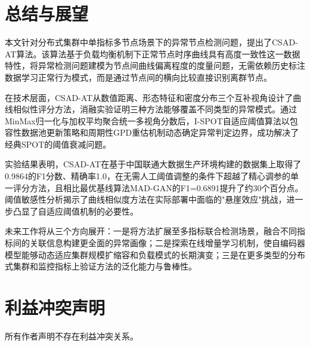 \documentclass[10.5pt,a4paper,twocolumn]{ctexart}
\begin{document}
\section{总结与展望}

本文针对分布式集群中单指标多节点场景下的异常节点检测问题，提出了CSAD-AT算法。该算法基于负载均衡机制下正常节点时序曲线具有高度一致性这一数据特性，将异常检测问题建模为节点间曲线偏离程度的度量问题，无需依赖历史标注数据学习正常行为模式，而是通过节点间的横向比较直接识别离群节点。

在技术层面，CSAD-AT从数值距离、形态特征和密度分布三个互补视角设计了曲线相似性评分方法，消融实验证明三种方法能够覆盖不同类型的异常模式。通过MinMax归一化与加权平均聚合统一多视角分数后，I-SPOT自适应阈值算法以包容性数据池更新策略和周期性GPD重估机制动态确定异常判定边界，成功解决了经典SPOT的阈值衰减问题。

实验结果表明，CSAD-AT在基于中国联通大数据生产环境构建的数据集上取得了0.9864的F1分数、精确率1.0，在无需人工阈值调整的条件下超越了精心调参的单一评分方法，且相比最优基线算法MAD-GAN的F1=0.6891提升了约30个百分点。阈值敏感性分析揭示了曲线相似度方法在实际部署中面临的"悬崖效应"挑战，进一步凸显了自适应阈值机制的必要性。

未来工作将从三个方向展开：一是将方法扩展至多指标联合检测场景，融合不同指标间的关联信息构建更全面的异常画像；二是探索在线增量学习机制，使自编码器模型能够动态适应集群规模扩缩容和负载模式的长期演变；三是在更多类型的分布式集群和监控指标上验证方法的泛化能力与鲁棒性。

\section*{利益冲突声明}
所有作者声明不存在利益冲突关系。
\end{document}
